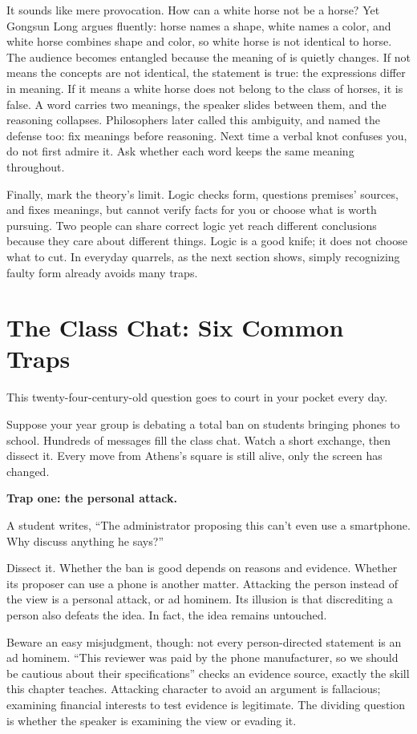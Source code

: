 It sounds like mere provocation. How can a white horse not be a horse? Yet Gongsun Long argues fluently: horse names a shape, white names a color, and white horse combines shape and color, so white horse is not identical to horse. The audience becomes entangled because the meaning of is quietly changes. If not means the concepts are not identical, the statement is true: the expressions differ in meaning. If it means a white horse does not belong to the class of horses, it is false. A word carries two meanings, the speaker slides between them, and the reasoning collapses. Philosophers later called this ambiguity, and named the defense too: fix meanings before reasoning. Next time a verbal knot confuses you, do not first admire it. Ask whether each word keeps the same meaning throughout.

Finally, mark the theory's limit. Logic checks form, questions premises' sources, and fixes meanings, but cannot verify facts for you or choose what is worth pursuing. Two people can share correct logic yet reach different conclusions because they care about different things. Logic is a good knife; it does not choose what to cut. In everyday quarrels, as the next section shows, simply recognizing faulty form already avoids many traps.

\section{The Class Chat: Six Common Traps}
This twenty-four-century-old question goes to court in your pocket every day.

Suppose your year group is debating a total ban on students bringing phones to school. Hundreds of messages fill the class chat. Watch a short exchange, then dissect it. Every move from Athens's square is still alive, only the screen has changed.

\textbf{Trap one: the personal attack.}

A student writes, ``The administrator proposing this can't even use a smartphone. Why discuss anything he says?''

Dissect it. Whether the ban is good depends on reasons and evidence. Whether its proposer can use a phone is another matter. Attacking the person instead of the view is a personal attack, or ad hominem. Its illusion is that discrediting a person also defeats the idea. In fact, the idea remains untouched.

Beware an easy misjudgment, though: not every person-directed statement is an ad hominem. ``This reviewer was paid by the phone manufacturer, so we should be cautious about their specifications'' checks an evidence source, exactly the skill this chapter teaches. Attacking character to avoid an argument is fallacious; examining financial interests to test evidence is legitimate. The dividing question is whether the speaker is examining the view or evading it.

